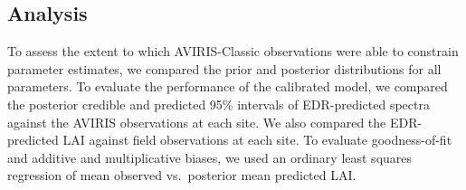 \subsection{Analysis}

To assess the extent to which AVIRIS-Classic observations were able to constrain parameter estimates, we compared the prior and posterior distributions for all parameters.
To evaluate the performance of the calibrated model, we compared the posterior credible and predicted 95\% intervals of EDR-predicted spectra against the AVIRIS observations at each site.
We also compared the EDR-predicted LAI against field observations at each site.
To evaluate goodness-of-fit and additive and multiplicative biases, we used an ordinary least squares regression of mean observed vs.\ posterior mean predicted LAI.\@
